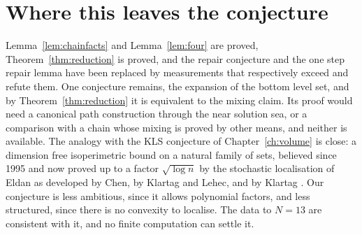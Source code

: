 \section{Where this leaves the conjecture}

Lemma~\ref{lem:chainfacts} and Lemma~\ref{lem:four} are proved, Theorem~\ref{thm:reduction} is proved, and the repair conjecture and the one step repair lemma have been replaced by measurements that respectively exceed and refute them. One conjecture remains, the expansion of the bottom level set, and by Theorem~\ref{thm:reduction} it is equivalent to the mixing claim. Its proof would need a canonical path construction through the near solution sea, or a comparison with a chain whose mixing is proved by other means, and neither is available. The analogy with the KLS conjecture of Chapter~\ref{ch:volume} is close: a dimension free isoperimetric bound on a natural family of sets, believed since 1995 and now proved up to a factor $\sqrt{\log n}$ by the stochastic localisation of Eldan as developed by Chen, by Klartag and Lehec, and by Klartag \cite{Chen,KlartagLehec,Klartag2023}. Our conjecture is less ambitious, since it allows polynomial factors, and less structured, since there is no convexity to localise. The data to $N = 13$ are consistent with it, and no finite computation can settle it.
